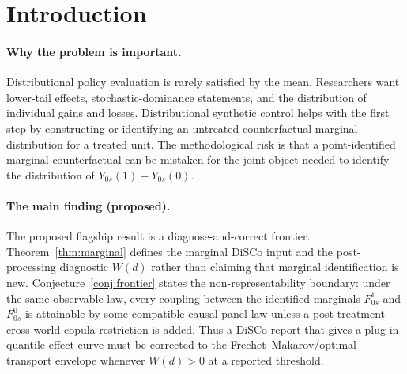 \documentclass[11pt]{article}
\theoremstyle{definition}
\theoremstyle{plain}
\theoremstyle{remark}
\begin{document}
\section{Introduction}
\paragraph{Why the problem is important.}
Distributional policy evaluation is rarely satisfied by the mean.  Researchers want lower-tail effects, stochastic-dominance statements, and the distribution of individual gains and losses.  Distributional synthetic control helps with the first step by constructing or identifying an untreated counterfactual marginal distribution for a treated unit.  The methodological risk is that a point-identified marginal counterfactual can be mistaken for the joint object needed to identify the distribution of \(Y_{0s}(1)-Y_{0s}(0)\).

\paragraph{The main finding (proposed).}
The proposed flagship result is a diagnose-and-correct frontier.  Theorem~\ref{thm:marginal} defines the marginal DiSCo input and the post-processing diagnostic \(W(d)\) rather than claiming that marginal identification is new.  Conjecture~\ref{conj:frontier} states the non-representability boundary: under the same observable law, every coupling between the identified marginals \(F^1_{0s}\) and \(F^0_{0s}\) is attainable by some compatible causal panel law unless a post-treatment cross-world copula restriction is added.  Thus a DiSCo report that gives a plug-in quantile-effect curve must be corrected to the Frechet--Makarov/optimal-transport envelope whenever \(W(d)>0\) at a reported threshold.
\end{document}

